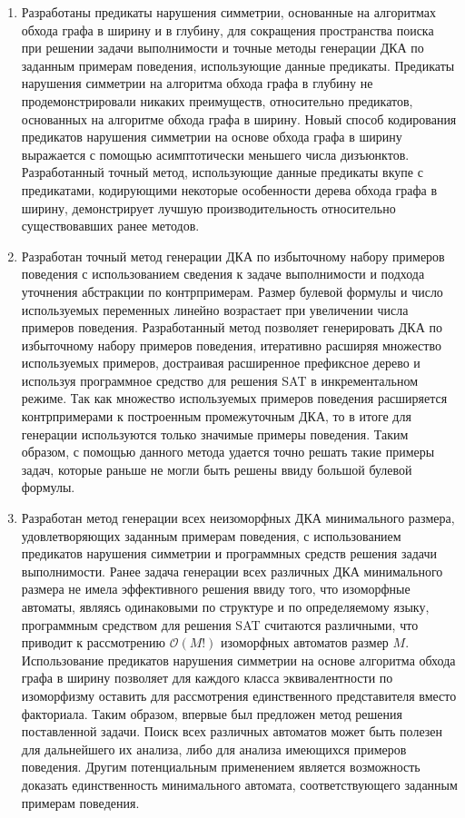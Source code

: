 \begin{enumerate}
  \item Разработаны предикаты нарушения симметрии, основанные на алгоритмах обхода графа в ширину и в глубину, для сокращения пространства поиска при решении задачи выполнимости и точные методы генерации ДКА по заданным примерам поведения, использующие данные предикаты. 
  Предикаты нарушения симметрии на алгоритма обхода графа в глубину не продемонстрировали никаких преимуществ, относительно предикатов, основанных на алгоритме обхода графа в ширину.
  Новый способ кодирования предикатов нарушения симметрии на основе обхода графа в ширину выражается с помощью асимптотически меньшего числа дизъюнктов.
  Разработанный точный метод, использующие данные предикаты вкупе с предикатами, кодирующими некоторые особенности дерева обхода графа в ширину, демонстрирует лучшую производительность относительно существовавших ранее методов.

  \item Разработан точный метод генерации ДКА по избыточному набору примеров поведения с использованием сведения к задаче выполнимости и подхода уточнения абстракции по контрпримерам.
  Размер булевой формулы и число используемых переменных линейно возрастает при увеличении числа примеров поведения.
  Разработанный метод позволяет генерировать ДКА по избыточному набору примеров поведения, итеративно расширяя множество используемых примеров, достраивая расширенное префиксное дерево и используя программное средство для решения SAT в инкрементальном режиме.
  Так как множество используемых примеров поведения расширяется контрпримерами к построенным промежуточным ДКА, то в итоге для генерации используются только значимые примеры поведения.
  Таким образом, с помощью данного метода удается точно решать такие примеры задач, которые раньше не могли быть решены ввиду большой булевой формулы.

  \item Разработан метод генерации всех неизоморфных ДКА минимального размера, удовлетворяющих заданным примерам поведения, с использованием предикатов нарушения симметрии и программных средств решения задачи выполнимости.
  Ранее задача генерации всех различных ДКА минимального размера не имела эффективного решения ввиду того, что изоморфные автоматы, являясь одинаковыми по структуре и по определяемому языку, программным средством для решения SAT считаются различными, что приводит к рассмотрению $\mathcal{O}\left(M!\right)$ изоморфных автоматов размер $M$.
  Использование предикатов нарушения симметрии на основе алгоритма обхода графа в ширину позволяет для каждого класса эквивалентности по изоморфизму оставить для рассмотрения единственного представителя вместо факториала. 
  Таким образом, впервые был предложен метод решения поставленной задачи.
  Поиск всех различных автоматов может быть полезен для дальнейшего их анализа, либо для анализа имеющихся примеров поведения.
  Другим потенциальным применением является возможность доказать единственность минимального автомата, соответствующего заданным примерам поведения.

 \end{enumerate}

